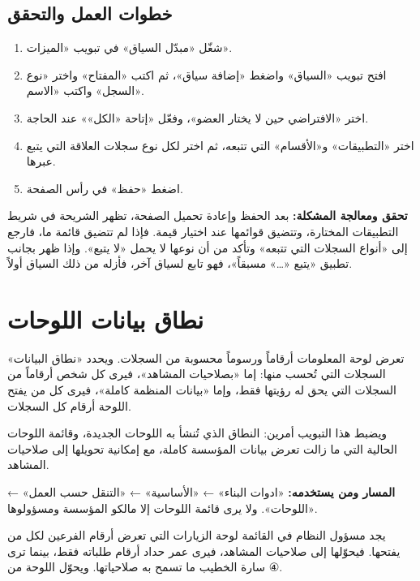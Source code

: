 \subsection{خطوات العمل والتحقق}
\begin{enumerate}
\item شغّل «مبدّل السياق» في تبويب «الميزات».
\item افتح تبويب «السياق» واضغط «إضافة سياق»، ثم اكتب «المفتاح» واختر «نوع السجل» واكتب «الاسم».
\item اختر «الافتراضي حين لا يختار العضو»، وفعّل «إتاحة «الكل»» عند الحاجة.
\item اختر «التطبيقات» و«الأقسام» التي تتبعه، ثم اختر لكل نوع سجلات العلاقة التي يتبع عبرها.
\item اضغط «حفظ» في رأس الصفحة.
\end{enumerate}

\textbf{تحقق ومعالجة المشكلة:} بعد الحفظ وإعادة تحميل الصفحة، تظهر الشريحة في شريط التطبيقات المختارة، وتتضيق قوائمها عند اختيار قيمة. فإذا لم تتضيق قائمة ما، فارجع إلى «أنواع السجلات التي تتبعه» وتأكد من أن نوعها لا يحمل «لا يتبع». وإذا ظهر بجانب تطبيق «يتبع «…» مسبقاً»، فهو تابع لسياق آخر، فأزله من ذلك السياق أولاً.

\clearpage
\section{نطاق بيانات اللوحات}
\label{sec:builder-feature-work-navigation-dashboards}

تعرض لوحة المعلومات أرقاماً ورسوماً محسوبة من السجلات. ويحدد «نطاق البيانات» السجلات التي تُحسب منها: إما «بصلاحيات المشاهد»، فيرى كل شخص أرقاماً من السجلات التي يحق له رؤيتها فقط، وإما «بيانات المنظمة كاملة»، فيرى كل من يفتح اللوحة أرقام كل السجلات.

ويضبط هذا التبويب أمرين: النطاق الذي تُنشأ به اللوحات الجديدة، وقائمة اللوحات الحالية التي ما زالت تعرض بيانات المؤسسة كاملة، مع إمكانية تحويلها إلى صلاحيات المشاهد.

\textbf{المسار ومن يستخدمه:} «ادوات البناء» ← «الأساسية» ← «التنقل حسب العمل» ← «اللوحات». ولا يرى قائمة اللوحات إلا مالكو المؤسسة ومسؤولوها.

\begin{rcnote}
يجد مسؤول النظام في القائمة لوحة الزيارات التي تعرض أرقام الفرعين لكل من يفتحها. فيحوّلها إلى صلاحيات المشاهد، فيرى عمر حداد أرقام طلباته فقط، بينما ترى سارة الخطيب ما تسمح به صلاحياتها. ويحوّل اللوحة من ④.
\end{rcnote}

